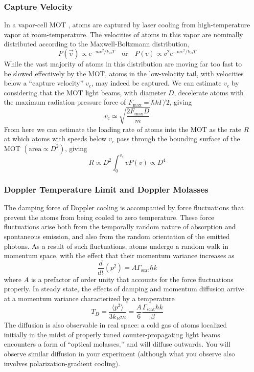 \documentclass{../lab}
\begin{document}
\subsubsection{Capture Velocity}
\label{subsubsec:CaptureVelocity}

In a vapor-cell MOT \cite{Monroe}, atoms are captured by laser cooling from high-temperature vapor at room-temperature. The velocities of atoms in this vapor are nominally distributed according to the Maxwell-Boltzmann distribution,
\begin{equation}
    P(\vec{v}) \propto e^{-mv^2/k_BT}
    \quad \text{or} \quad
    P(v) \propto v^2e^{-mv^2/k_BT}
\end{equation}
While the vast majority of atoms in this distribution are moving far too fast to be slowed effectively by the MOT, atoms in the low-velocity tail, with velocities below a ``capture velocity'' $v_c$, may indeed be captured. We can estimate $v_c$ by considering that the MOT light beams, with diameter $D$, decelerate atoms with the maximum radiation pressure force of $F_\text{max} = \hbar k \Gamma/2$, giving
\begin{equation}
    v_c \simeq \sqrt{\frac{2F_\text{max}D}{m}}
\end{equation}
From here we can estimate the loading rate of atoms into the MOT as the rate $R$ at which atoms with speeds below $v_c$ pass through the bounding surface of the MOT $\left(\text{area} \propto D^2\right)$, giving
\begin{equation}
    R \propto D^2 \int_0^{v_c} v P(v) \propto D^4
\end{equation}

\subsubsection{Doppler Temperature Limit and Doppler Molasses}

The damping force of Doppler cooling is accompanied by force fluctuations that prevent the atoms from being cooled to zero temperature. These force fluctuations arise both from the temporally random nature of absorption and spontaneous emission, and also from the random orientation of the emitted photons. As a result of such fluctuations, atoms undergo a random walk in momentum space, with the effect that their momentum variance increases as
\begin{equation}
    \frac{d}{dt}(p^2) = A\Gamma_\text{scat}\hbar k
\end{equation}
where $ A$ is a prefactor of order unity that accounts for the force fluctuations properly. In steady state, the effects of damping and momentum diffusion arrive at a momentum variance characterized by a temperature
\begin{equation}
    T_D = \frac{\langle p^2\rangle}{3 k_B m} = \frac{A}{6}\frac{\Gamma_\text{scat}\hbar k}{\beta}
\end{equation}
The diffusion is also observable in real space: a cold gas of atoms localized initially in the midst of properly tuned counter-propagating light beams encounters a form of ``optical molasses,'' and will diffuse outwards. You will observe similar diffusion in your experiment (although what you observe also involves polarization-gradient cooling).
\end{document}
